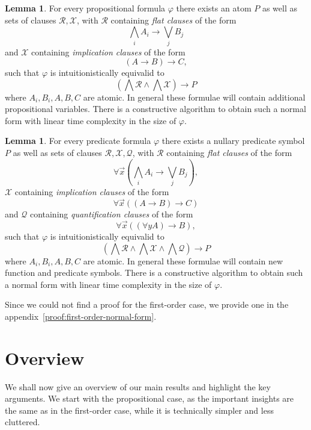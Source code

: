 \documentclass{easychair}
\theoremstyle{definition}
\theoremstyle{definition}
\theoremstyle{definition}
\newtheorem{lemma}[theorem]{Lemma}
\theoremstyle{definition}
\theoremstyle{definition}
\theoremstyle{definition}
\theoremstyle{definition}
\begin{document}
\begin{lemma}\label{lemma:propositional-normal-form}
	For every propositional formula $\varphi$ there exists an atom $P$ as well as sets of clauses $\mathcal R, \mathcal X$, with $\mathcal R$ containing  \emph{flat clauses} of the form
	$$\bigwedge_iA_i\to\bigvee_jB_j$$
	and $\mathcal X$ containing \emph{implication clauses} of the form
	$$(A\to B)\to C,$$
	such that $\varphi$ is intuitionistically equivalid to
	$$\left(\bigwedge\mathcal R\wedge\bigwedge\mathcal X\right)\to P$$where $A_i, B_i, A, B, C$ are atomic. In general these formulae will contain additional propositional variables. There is a constructive algorithm to obtain such a normal form with linear time complexity in the size of $\varphi$.
\end{lemma}

\begin{lemma}\label{lemma:first-order-normal-form}
	For every predicate formula $\varphi$ there exists a nullary predicate symbol $P$ as well as sets of clauses $\mathcal R,\mathcal X, \mathcal Q$, with $\mathcal R$ containing \emph{flat clauses} of the form
	$$\forall \vec x\left(\bigwedge_i A_i\to \bigvee_jB_j\right),$$
	$\mathcal X$ containing \emph{implication clauses} of the form
	$$\forall \vec x\left((A\to B)\to C\right)$$
	and $\mathcal Q$ containing \emph{quantification clauses} of the form
	$$\forall\vec x\left((\forall y A)\to B\right),$$
	such that $\varphi$ is intuitionistically equivalid to
	$$\left(\bigwedge\mathcal R\wedge\bigwedge \mathcal X\wedge\bigwedge\mathcal Q\right)\to P$$where $A_i, B_i, A, B, C$ are atomic. In general these formulae will contain new function and predicate symbols. There is a constructive algorithm to obtain such a normal form with linear time complexity in the size of $\varphi$.
\end{lemma}

Since we could not find a proof for the first-order case, we provide one in the appendix~\ref{proof:first-order-normal-form}.

\section{Overview}
\label{sec:overview}

We shall now give an overview of our main results and highlight the key arguments.
We start with the propositional case, as the important insights are the same as in the first-order case, while it is technically simpler and less cluttered.
\end{document}
